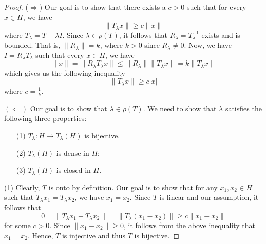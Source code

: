 \begin{proof}
    (\( \Longrightarrow \)) Our goal is to show that there exists a \( c > 0  \) such that for every \( x \in H \), we have  
    \[  \|{T}_{\lambda}x \| \geq c \|x \| \tag{2} \]
    where \( {T}_{\lambda} = T - \lambda I  \). 
    Since \( \lambda \in \rho(T) \), it follows that \( {R}_{\lambda} = T^{-1}_{\lambda} \) exists and is bounded. That is, \( \|{R}_{\lambda}\| = k  \), where \( k > 0  \) since \( {R}_{\lambda} \neq 0  \). Now, we have \( I = {R}_{\lambda} {T}_{\lambda} \) such that every \( x \in H \), we have 
    \[  \|x \| = \|{R}_{\lambda} {T}_{\lambda}x \| \leq  \|{R}_{\lambda} \| \|{T}_{\lambda} x \| = k \|{T}_{\lambda}x \|  \]
    which gives us the following inequality
    \[  \|{T}_{\lambda}x \| \geq c | x  |  \]
    where \( c = \frac{ 1 }{ k  }  \).

    \( (\Longleftarrow) \) Our goal is to show that \( \lambda \in \rho(T) \). We need to show that \( \lambda  \) satisfies the following three properties:
    \begin{enumerate}
        \item[(1)] \( {T}_{\lambda} : H \to {T}_{\lambda}(H) \) is bijective.
        \item[(2)] \( {T}_{\lambda}(H) \) is dense in \( H  \);
        \item[(3)] \( {T}_{\lambda}(H) \) is closed in \( H \).
    \end{enumerate}
    (1) Clearly, \( T  \) is onto by definition. Our goal is to show that for any \( {x}_{1}, {x}_{2} \in H  \) such that \( {T}_{\lambda} {x}_{1} = {T}_{\lambda} {x}_{2} \), we have \( {x}_{1} = {x}_{2} \). Since \( T  \) is linear and our assumption, it follows that 
    \[  0 = \|{T}_{\lambda}{x}_{1} - {T}_{\lambda} {x}_{2} \| = \|{T}_{\lambda} ({x}_{1} - {x}_{2})\| \geq c \| {x}_{1} - {x}_{2} \| \]
    for some \( c > 0  \). Since \( \|{x}_{1} - {x}_{2}\| \geq 0  \), it follows from the above inequality that \( {x}_{1} = {x}_{2} \). Hence, \( T  \) is injective and thus \( T  \) is bijective.


\end{proof}
